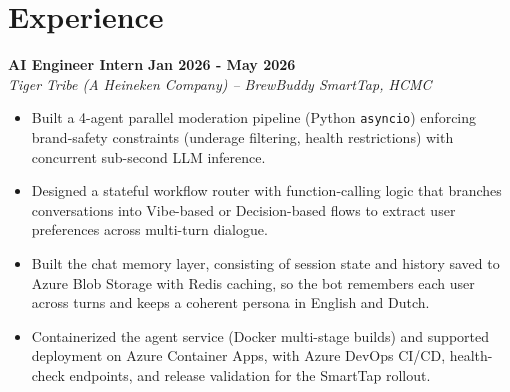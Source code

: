 \documentclass[a4paper,10pt]{article}
\begin{document}
\section{Experience}

\textbf{AI Engineer Intern} \hfill \textbf{Jan 2026 - May 2026} \\
\textit{Tiger Tribe (A Heineken Company) -- BrewBuddy SmartTap, HCMC} \\
\vspace{-0.3em}
\begin{itemize}[leftmargin=1.2em, itemsep=0.05em, parsep=0pt, topsep=0pt]
    \item Built a 4-agent parallel moderation pipeline (Python \texttt{asyncio}) enforcing brand-safety constraints (underage filtering, health restrictions) with concurrent sub-second LLM inference.
    \item Designed a stateful workflow router with function-calling logic that branches conversations into Vibe-based or Decision-based flows to extract user preferences across multi-turn dialogue.
    \item Built the chat memory layer, consisting of session state and history saved to Azure Blob Storage with Redis caching, so the bot remembers each user across turns and keeps a coherent persona in English and Dutch.
    \item Containerized the agent service (Docker multi-stage builds) and supported deployment on Azure Container Apps, with Azure DevOps CI/CD, health-check endpoints, and release validation for the SmartTap rollout.
\end{itemize}
\end{document}
